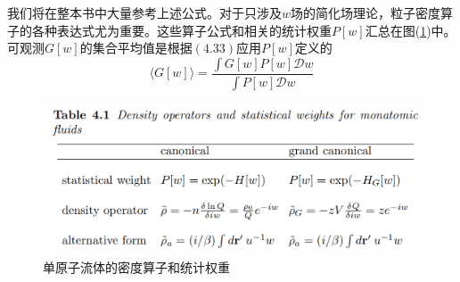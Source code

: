 我们将在整本书中大量参考上述公式。对于只涉及$ w$场的简化场理论，粒子密度算子的各种表达式尤为重要。这些算子公式和相关的统计权重$P[ w ]$汇总在图(\ref{4.1})中。可观测$G[ w]$的集合平均值是根据$(4.33)$应用$P[ w]$定义的\\
\begin{equation}
\langle G[w] \rangle = \frac{\int G[w]P[w]\mathcal{D}w}{\int P[w]\mathcal{D}w}
\end{equation}
\begin{figure}[H]
	\centering   
	\includegraphics[width=12cm]{./figures/1.png}
	\caption{单原子流体的密度算子和统计权重}
	\label{4.1}
\end{figure}

